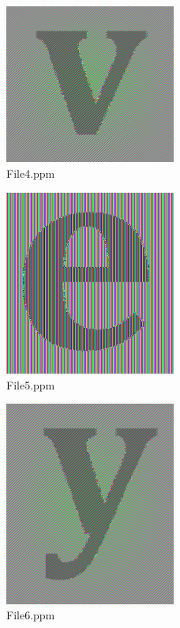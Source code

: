 \documentclass{article}
\begin{document}
\begin{figure}
    \centering
    \includegraphics[width=0.5\textwidth]{images/File4.png}
    \caption{File4.ppm}
\end{figure}
\begin{figure}
    \centering
    \includegraphics[width=0.5\textwidth]{images/File5.png}
    \caption{File5.ppm}
\end{figure}
\begin{figure}
    \centering
    \includegraphics[width=0.5\textwidth]{images/File6.png}
    \caption{File6.ppm}
\end{figure}
\end{document}
